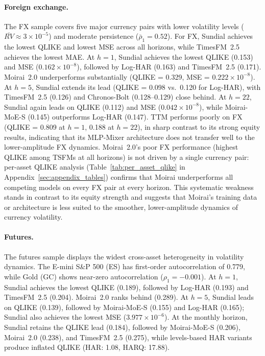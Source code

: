 \documentclass[12pt]{article}
\begin{document}
\paragraph{Foreign exchange.}
The FX sample covers five major currency pairs with lower volatility levels ($\bar{RV} \approx 3 \times 10^{-5}$) and moderate persistence ($\bar{\rho}_1 = 0.52$). For FX, Sundial achieves the lowest QLIKE and lowest MSE across all horizons, while TimesFM~2.5 achieves the lowest MAE. At $h = 1$, Sundial achieves the lowest QLIKE (0.153) and MSE ($0.162 \times 10^{-8}$), followed by Log-HAR (0.163) and TimesFM~2.5 (0.171). Moirai~2.0 underperforms substantially (QLIKE = 0.329, MSE = $0.222 \times 10^{-8}$). At $h = 5$, Sundial extends its lead (QLIKE = 0.098 vs.\ 0.120 for Log-HAR), with TimesFM~2.5 (0.126) and Chronos-Bolt (0.128--0.129) close behind. At $h = 22$, Sundial again leads on QLIKE (0.112) and MSE ($0.042 \times 10^{-8}$), while Moirai-MoE-S (0.145) outperforms Log-HAR (0.147). TTM performs poorly on FX (QLIKE = 0.809 at $h = 1$, 0.188 at $h = 22$), in sharp contrast to its strong equity results, indicating that its MLP-Mixer architecture does not transfer well to the lower-amplitude FX dynamics. Moirai~2.0's poor FX performance (highest QLIKE among TSFMs at all horizons) is not driven by a single currency pair: per-asset QLIKE analysis (Table~\ref{tab:per_asset_qlike} in Appendix~\ref{sec:appendix_tables}) confirms that Moirai underperforms all competing models on every FX pair at every horizon. This systematic weakness stands in contrast to its equity strength and suggests that Moirai's training data or architecture is less suited to the smoother, lower-amplitude dynamics of currency volatility.

\paragraph{Futures.}
The futures sample displays the widest cross-asset heterogeneity in volatility dynamics. The E-mini S\&P 500 (ES) has first-order autocorrelation of 0.779, while Gold (GC) shows near-zero autocorrelation ($\rho_1 = -0.001$). At $h = 1$, Sundial achieves the lowest QLIKE (0.189), followed by Log-HAR (0.193) and TimesFM~2.5 (0.204). Moirai~2.0 ranks behind (0.289). At $h = 5$, Sundial leads on QLIKE (0.139), followed by Moirai-MoE-S (0.155) and Log-HAR (0.165); Sundial also achieves the lowest MSE ($3.977 \times 10^{-6}$). At the monthly horizon, Sundial retains the QLIKE lead (0.184), followed by Moirai-MoE-S (0.206), Moirai~2.0 (0.238), and TimesFM~2.5 (0.275), while levels-based HAR variants produce inflated QLIKE (HAR: 1.08, HARQ: 17.88).
\end{document}
